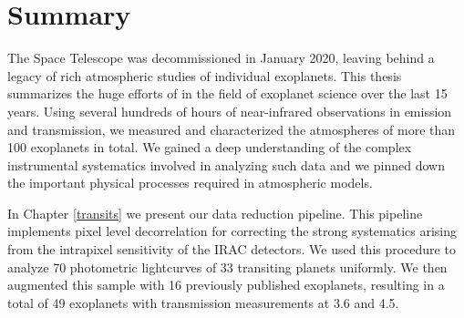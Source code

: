 
\renewcommand{\thefigure}{\Alph{figure}}

\setcounter{figure}{0}

\setcounter{footnote}{0}

\cleardoublepage

\chapter{Summary}

The \spitzer Space Telescope was decommissioned in January 2020, leaving behind a legacy of rich atmospheric studies of individual exoplanets. This thesis summarizes the huge efforts of \spitzer in the field of exoplanet science over the last 15 years. Using several hundreds of hours of near-infrared \spitzerIRAC observations in emission and transmission, we measured and characterized the atmospheres of more than 100 exoplanets in total. We gained a deep understanding of the complex instrumental systematics involved in analyzing such data and we pinned down the important physical processes required in atmospheric models.

In Chapter \ref{transits} we present our \spitzerIRAC data reduction pipeline. This pipeline implements pixel level decorrelation for correcting the strong systematics arising from the intrapixel sensitivity of the IRAC detectors. We used this procedure to analyze 70 photometric lightcurves of 33 transiting planets uniformly. We then augmented this sample with 16 previously published exoplanets, resulting in a total of 49 exoplanets with transmission measurements at 3.6 and 4.5\um.

